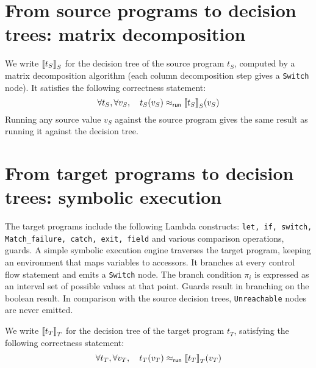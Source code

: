 \documentclass[12pt]{article}
\begin{document}
\section{From source programs to decision trees: matrix decomposition}

We write ${\llbracket{t_S}\rrbracket}_S$ for the decision tree of the source program
$t_S$, computed by a matrix decomposition algorithm (each column
decomposition step gives a \texttt{Switch} node).
It satisfies the following correctness statement:
\[
\forall t_S, \forall v_S, \quad t_S(v_S) \mathrel{\approx_{\mathsf{run}}} {\llbracket{t_S}\rrbracket}_S(v_S)
\]
Running any source value $v_S$ against the source program gives the
same result as running it against the decision tree.



\section{From target programs to decision trees: symbolic execution}
The target programs include the following Lambda constructs:
\texttt{let, if, switch, Match\_failure, catch, exit, field} and
various comparison operations, guards. A simple symbolic execution
engine traverses the target program, keeping an environment that maps
variables to accessors. It branches at every control flow statement
and emits a \texttt{Switch} node. The branch condition $\pi_i$ is
expressed as an interval set of possible values at that point.
%
Guards result in branching on the boolean result.
%
In comparison with the source decision trees, \texttt{Unreachable}
nodes are never emitted.

We write ${\llbracket{t_T}\rrbracket}_T$ for the decision tree of the target program
$t_T$, satisfying the following correctness statement:
\[
\forall t_T, \forall v_T, \quad t_T(v_T) \mathrel{\approx_{\mathsf{run}}} {\llbracket{t_T}\rrbracket}_T(v_T)
\]
\end{document}
